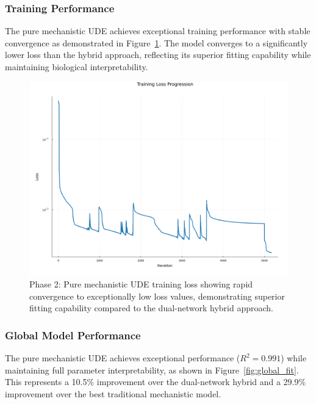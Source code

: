 \documentclass{juliacon}
\begin{document}
\subsubsection{Training Performance}

The pure mechanistic UDE achieves exceptional training performance with stable convergence as demonstrated in Figure~\ref{fig:pure_training_loss}. The model converges to a significantly lower loss than the hybrid approach, reflecting its superior fitting capability while maintaining biological interpretability.

\begin{figure}[H]\centering
\includegraphics[width=\linewidth]{pure_training_loss.png}
\caption{Phase 2: Pure mechanistic UDE training loss showing rapid convergence to exceptionally low loss values, demonstrating superior fitting capability compared to the dual-network hybrid approach.}
\label{fig:pure_training_loss}
\end{figure}

\subsubsection{Global Model Performance}

The pure mechanistic UDE achieves exceptional performance ($R^2 = 0.991$) while maintaining full parameter interpretability, as shown in Figure~\ref{fig:global_fit}. This represents a 10.5\% improvement over the dual-network hybrid and a 29.9\% improvement over the best traditional mechanistic model.
\end{document}
